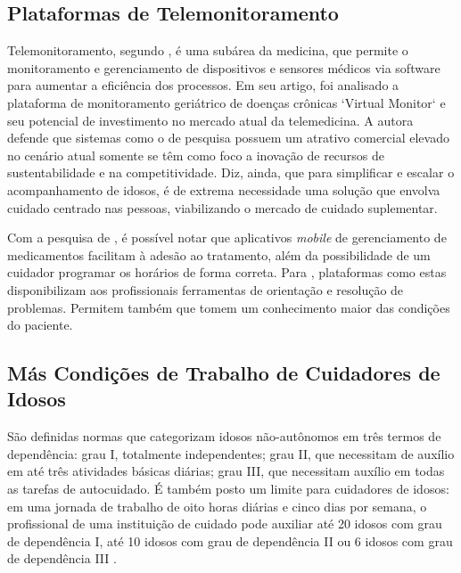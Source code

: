 \documentclass[
	article,			%
	12pt,				%
	oneside,			%
	a4paper,			%
    BIBLATEX,           %
	english,			%
	brazil,				%
	sumario=tradicional
	]{abntex2}
\begin{document}
\subsection{Plataformas de Telemonitoramento}

Telemonitoramento, segundo , é uma subárea da medicina, que permite o monitoramento e gerenciamento de dispositivos e sensores médicos via software para aumentar a eficiência dos processos. Em seu artigo, foi analisado a plataforma de monitoramento geriátrico de doenças crônicas `Virtual Monitor` e seu potencial de investimento no mercado atual da telemedicina. A autora defende que sistemas como o de pesquisa possuem um atrativo comercial elevado no cenário atual somente se têm como foco a inovação de recursos de sustentabilidade e na competitividade. Diz, ainda, que para simplificar e escalar o acompanhamento de idosos, é de extrema necessidade uma solução que envolva cuidado centrado nas pessoas, viabilizando o mercado de cuidado suplementar.

Com a pesquisa de , é possível notar que aplicativos \textit{mobile} de gerenciamento de medicamentos facilitam à adesão ao tratamento, além da possibilidade de um cuidador programar os horários de forma correta. Para , plataformas como estas disponibilizam aos profissionais ferramentas de orientação e resolução de problemas. Permitem também que tomem um conhecimento maior das condições do paciente.

\subsection{Más Condições de Trabalho de Cuidadores de Idosos}

São definidas normas que categorizam idosos não-autônomos em três termos de dependência: grau I, totalmente independentes; grau II, que necessitam de auxílio em até três atividades básicas diárias; grau III, que necessitam auxílio em todas as tarefas de autocuidado. É também posto um limite para cuidadores de idosos: em uma jornada de trabalho de oito horas diárias e cinco dias por semana, o profissional de uma instituição de cuidado pode auxiliar até 20 idosos com grau de dependência I, até 10 idosos com grau de dependência II ou 6 idosos com grau de dependência III \cite{ministeriosaude2021ilpi}.
\end{document}
